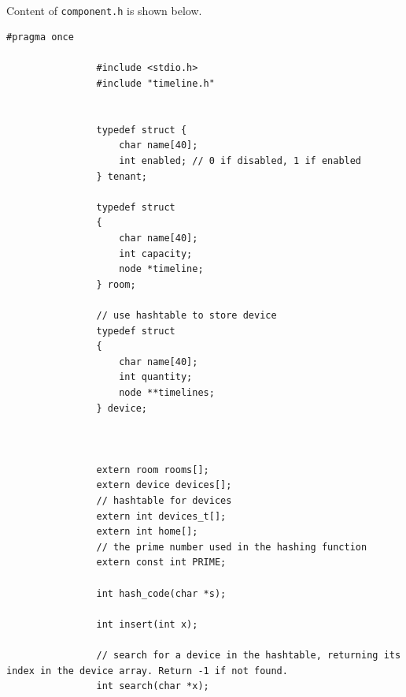\documentclass{article}
\begin{document}
            \paragraph{}
                Content of \texttt{component.h} is shown below.
            \begin{Verbatim}[gobble=8]
                #pragma once

                #include <stdio.h>
                #include "timeline.h"
                
                
                typedef struct {
                    char name[40];
                    int enabled; // 0 if disabled, 1 if enabled
                } tenant;
                
                typedef struct
                {
                    char name[40];
                    int capacity;
                    node *timeline;
                } room;
                
                // use hashtable to store device
                typedef struct
                {
                    char name[40];
                    int quantity;
                    node **timelines;
                } device;
                
                
                
                extern room rooms[];
                extern device devices[];
                // hashtable for devices
                extern int devices_t[];
                extern int home[];
                // the prime number used in the hashing function
                extern const int PRIME;
                
                int hash_code(char *s);
                
                int insert(int x);
                
                // search for a device in the hashtable, returning its index in the device array. Return -1 if not found.
                int search(char *x);
            \end{Verbatim}
\end{document}
